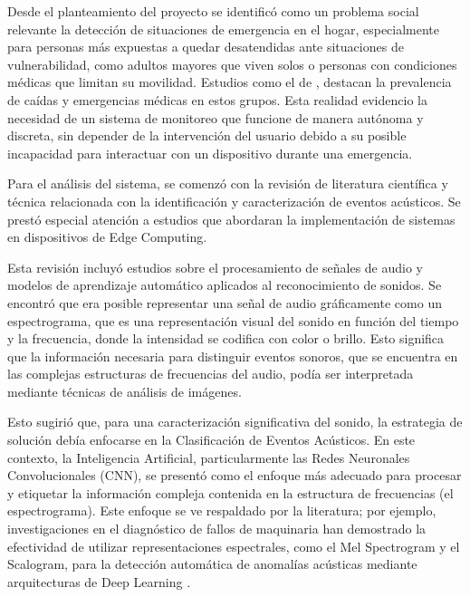 

Desde el planteamiento del proyecto se identificó como un problema social relevante la detección de situaciones de emergencia en el hogar, especialmente para personas más expuestas a quedar desatendidas ante situaciones de vulnerabilidad, como adultos mayores que viven solos o personas con condiciones médicas que limitan su movilidad. Estudios como el de \cite{bezold2021sensor}, destacan la prevalencia de caídas y emergencias médicas en estos grupos. Esta realidad evidencio la necesidad de un sistema de monitoreo que funcione de manera autónoma y discreta, sin depender de la intervención del usuario debido a su posible incapacidad para interactuar con un dispositivo durante una emergencia.

Para el análisis del sistema, se comenzó con la revisión de literatura científica y técnica relacionada con la identificación y caracterización de eventos acústicos. Se prestó especial atención a estudios que abordaran la implementación de sistemas en dispositivos de Edge Computing.

Esta revisión incluyó estudios sobre el procesamiento de señales de audio y modelos de aprendizaje automático aplicados al reconocimiento de sonidos. Se encontró que era posible representar una señal de audio gráficamente como un espectrograma, que es una representación visual del sonido en función del tiempo y la frecuencia, donde la intensidad se codifica con color o brillo. Esto significa que la información necesaria para distinguir eventos sonoros, que se encuentra en las complejas estructuras de frecuencias del audio, podía ser interpretada mediante técnicas de análisis de imágenes.

Esto sugirió que, para una caracterización significativa del sonido, la estrategia de solución debía enfocarse en la Clasificación de Eventos Acústicos. En este contexto, la Inteligencia Artificial, particularmente las Redes Neuronales Convolucionales (CNN), se presentó como el enfoque más adecuado para procesar y etiquetar la información compleja contenida en la estructura de frecuencias (el espectrograma). Este enfoque se ve respaldado por la literatura; por ejemplo, investigaciones en el diagnóstico de fallos de maquinaria han demostrado la efectividad de utilizar representaciones espectrales, como el Mel Spectrogram y el Scalogram, para la detección automática de anomalías acústicas mediante arquitecturas de Deep Learning \cite{tran2020drill}.

